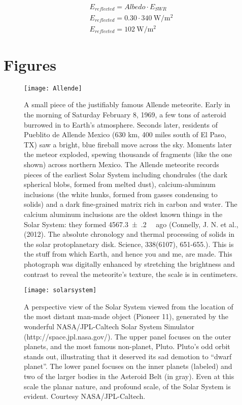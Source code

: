 \begin{align}
	E_{reflected}=Albedo\cdot E_{SWR}\\
	E_{reflected}=0.30\cdot \SI{340}{\watt\per\m^{2}}\\ \label{eq:eref}
	E_{reflected}=\SI{102}{\watt\per\m^{2}}
\end{align}



\section{Figures} \label{Geosphere_Figures}

\begin{figure}[p]
\centering
\texttt{[image: Allende]}%
\caption{A small piece of the justifiably famous Allende meteorite. Early in the morning of Saturday February 8, 1969, a few tons of asteroid burrowed in to Earth's atmosphere. Seconds later, residents of Pueblito de Allende Mexico (630 km, 400 miles south of El Paso, TX) saw a bright, blue fireball move across the sky. Moments later the meteor exploded, spewing thousands of fragments (like the one shown) across northern Mexico. The Allende meteorite records pieces of the earliest Solar System including chondrules (the dark spherical blobs, formed from melted dust), calcium-aluminum inclusions (the white hunks, formed from gasses condensing to solids) and a dark fine-grained matrix rich in carbon and water. The calcium aluminum inclusions are the oldest known things in the Solar System: they formed \SI{4567.3(2)}{\giga\year} ago (Connelly, J. N. et al., (2012). The absolute chronology and thermal processing of solids in the solar protoplanetary disk. Science, 338(6107), 651-655.). This is the stuff from which Earth, and hence you and me, are made. This photograph was digitally enhanced by stretching the brightness and contrast to reveal the meteorite's texture, the scale is in centimeters.}  
\label{fig:allende}
\end{figure}

\begin{figure}[p]
\centering
\texttt{[image: solarsystem]}%
\caption{A perspective view of the Solar System viewed from the location of the most distant man-made object (Pioneer 11), generated by the wonderful NASA/JPL-Caltech Solar System Simulator (http://space.jpl.nasa.gov/). The upper panel focuses on the outer planets, and the most famous non-planet, Pluto. Pluto's odd orbit stands out, illustrating that it deserved its sad demotion to ``dwarf planet''. The lower panel focuses on the inner planets (labeled) and two of the larger bodies in the Asteroid Belt (in gray). Even at this scale the planar nature, and profound scale, of the Solar System is evident. Courtesy NASA/JPL-Caltech.}  
\label{fig:solsys1}
\end{figure}

